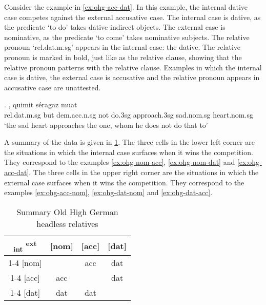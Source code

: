 Consider the example in \ref{ex:ohg-acc-dat}. In this example, the internal dative case competes against the external accusative case.
The internal case is dative, as the predicate  `to do' takes dative indirect objects.
The external case is nominative, as the predicate  `to come' takes nominative subjects.
The relative pronoun  `\ac{rel}.\ac{dat}.\ac{m}.\ac{sg}' appears in the internal case: the dative. The relative pronoun is marked in bold, just like as the relative clause, showing that the relative pronoun patterns with the relative clause.
Examples in which the internal case is dative, the external case is accusative and the relative pronoun appears in accusative case are unattested.

\exg.     , quimit séragaz muat\\
\ac{rel}.\ac{dat}.\ac{m}.\ac{sg} but \ac{dem}.\ac{acc}.\ac{n}.\ac{sg} not do.3\ac{sg}\scsub{[dat]} approach.3\ac{sg}\scsub{[acc]} sad.\ac{nom}.\ac{sg} heart.\ac{nom}.\ac{sg}\\
`the sad heart approaches the one, whom he does not do that to' \label{ex:ohg-acc-dat}

A summary of the data is given in \ref{tbl:summary-old-high-german}.
The three cells in the lower left corner are the situations in which the internal case surfaces when it wins the competition. They correspond to the examples \ref{ex:ohg-nom-acc}, \ref{ex:ohg-nom-dat} and \ref{ex:ohg-acc-dat}.
The three cells in the upper right corner are the situations in which the external case surfaces when it wins the competition. They correspond to the examples \ref{ex:ohg-acc-nom}, \ref{ex:ohg-dat-nom} and \ref{ex:ohg-dat-acc}.

\begin{table}[H]
  \center
  \caption{Summary Old High German headless relatives}
  \begin{tabular}{c|c|c|c}
    \toprule
        \textsubscript{\ac{int}} \textsuperscript{\ac{ext}}
          & [\ac{nom}]
          & [\ac{acc}]
          & [\ac{dat}]
          \\ \cmidrule{1-4}
      [\ac{nom}]
          &
          & \ac{acc}
          & \ac{dat}
          \\ \cmidrule{1-4}
      [\ac{acc}]
          & \ac{acc}
          &
          & \ac{dat}
          \\ \cmidrule{1-4}
      [\ac{dat}]
          & \ac{dat}
          & \ac{dat}
          &
          \\
    \bottomrule
  \end{tabular}
    \label{tbl:summary-old-high-german}
\end{table}

